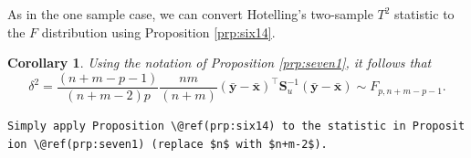 \documentclass[]{book}
\newtheorem{corollary}{Corollary}[chapter]
\theoremstyle{definition}
\theoremstyle{definition}
\theoremstyle{definition}
\theoremstyle{remark}
\begin{document}
As in the one sample case, we can convert Hotelling's two-sample \(T^2\) statistic to the \(F\) distribution using Proposition \ref{prp:six14}.

\begin{corollary}
\protect\hypertarget{cor:cseven1}{}{\label{cor:cseven1} }Using the notation of Proposition \ref{prp:seven1}, it follows that
\[\delta^2 = \frac{(n+m-p-1)}{(n+m-2)p} \frac{nm}{(n+m)} (\bar{\boldsymbol y} - \bar{\boldsymbol x})^\top \boldsymbol S_u^{-1} (\bar{\boldsymbol y} - \bar{\boldsymbol x}) \sim F_{p,n+m-p-1}.\]
\end{corollary}

\texttt{Simply\ apply\ Proposition\ \textbackslash{}@ref(prp:six14)\ to\ the\ statistic\ in\ Proposition\ \textbackslash{}@ref(prp:seven1)\ (replace\ \$n\$\ with\ \$n+m-2\$).}
\end{document}
